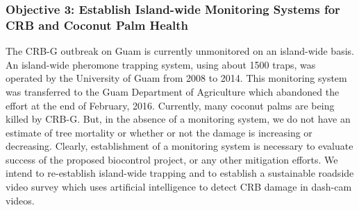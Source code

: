 \documentclass[12pt,letterpaper,english,bibliography=totocnumbered, abstract=on]{scrartcl}
\begin{document}
%
%	
%	
%	
%

\subsubsection{Objective 3:  Establish Island-wide Monitoring Systems for CRB and Coconut Palm Health}
\label{sub: monitoring}

The CRB-G outbreak on Guam is currently unmonitored on an island-wide basis. An island-wide pheromone trapping system, using about 1500 traps, was operated by the University of Guam from 2008 to 2014. This monitoring system was transferred to the Guam Department of Agriculture which abandoned the effort at the end of February, 2016.  Currently, many coconut palms are being killed by CRB-G. But, in the absence of a monitoring system, we do not have an estimate of tree mortality or whether or not the damage is increasing or decreasing. Clearly, establishment of a monitoring system is necessary to evaluate success of the proposed biocontrol project, or any other mitigation efforts. We intend to re-establish island-wide trapping and to establish a sustainable roadside video survey which uses artificial intelligence to detect CRB damage in dash-cam videos. 
\end{document}
